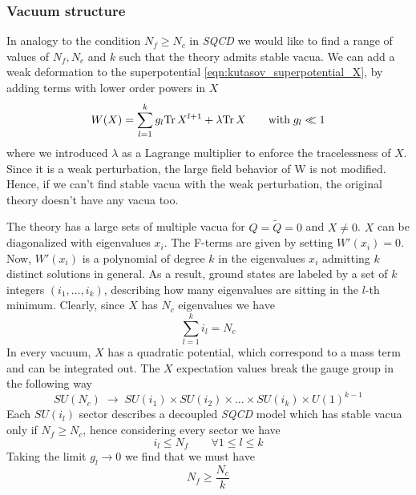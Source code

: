 \subsubsection{Vacuum structure}
\label{sec:kutasov_vacuum_struct_deformed}
In analogy to the condition $N_f \geq N_c$ in \emph{SQCD} we would like to find a range of values of $N_f,N_c$ and $k$ such that the theory admits stable vacua.  
We can add a weak deformation to the superpotential \eqref{eqn:kutasov_superpotential_X}, by adding terms with lower order powers in $X$
\begin{equation}
W(X) = \sum_{l=1}^k g_l  \mathrm{Tr } \, X^{l+1} + \lambda \mathrm{Tr } \, X \qquad \hbox{with} \; g_l \ll 1
\label{eqn:kutasov_deformed_superpotential}
\end{equation}
where we introduced $\lambda$ as a Lagrange multiplier to enforce the tracelessness of $X$.
Since it is a weak perturbation, the large field behavior of W is not modified.
Hence, if we can't find stable vacua with the weak perturbation, the original theory doesn't have any vacua too. 

The theory has a large sets of multiple vacua for $Q=\tilde{Q} = 0$ and $X \neq 0 $. 
$X$ can be diagonalized with eigenvalues $x_i$.
The F-terms are given by setting $W'(x_i) = 0$. 
Now, $W'(x_i)$ is a polynomial of degree $k$ in the eigenvalues $x_i$ admitting $k$ distinct solutions in general. 
As a result, ground states are labeled by a set of $k$ integers $(i_1, \dotsc, i_k)$, describing how many eigenvalues are sitting in the $l$-th minimum. Clearly, since $X$ has $N_c$ eigenvalues we have 
\begin{equation}
 \sum_{l=1}^k i_l = N_c
\end{equation}
In every vacuum, $X$ has a quadratic potential, which correspond to a mass term and can be integrated out.
The $X$ expectation values break the gauge group in the following way
\begin{equation}
	SU(N_c) \; \longrightarrow \; SU(i_1) \times SU(i_2) \times \dots \times SU(i_k) \times U(1)^{k-1}
\end{equation}
Each $SU({i_l})$ sector describes a decoupled \emph{SQCD} model which has stable vacua only if $N_f \geq N_c$, hence considering every sector we have 
\begin{equation}
i_l \leq N_f \qquad \forall 1 \leq l \leq k
\end{equation}
Taking the limit $g_l \rightarrow 0$ we find that we must have
\begin{equation}
 N_f \geq \frac{N_c}{k}
\end{equation}

